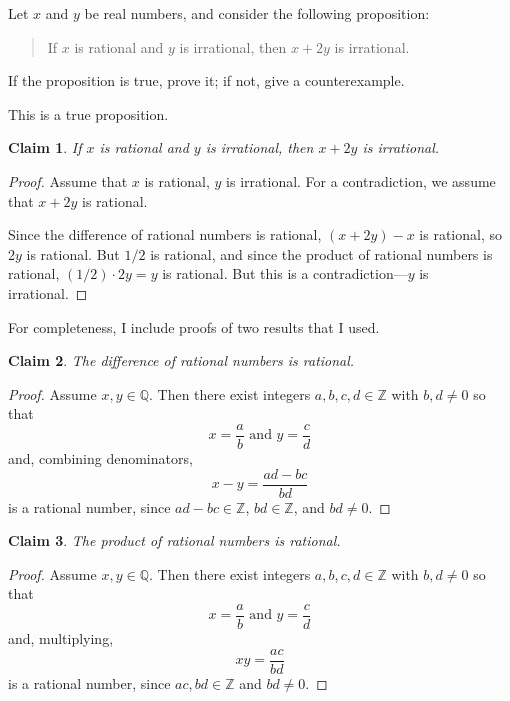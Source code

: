 \documentclass[12pt]{midterm}
\newtheorem*{claim}{Claim}
\begin{document}
\begin{exam}
\begin{solution}
\begin{solutiontext}
\end{solutiontext}\end{solution}


\begin{problem}[360]
  Let $x$ and $y$ be real numbers, and consider the following
  proposition:
  \begin{quote}
    If $x$ is rational and $y$ is irrational, then $x + 2y$ is irrational.
  \end{quote}
  If the proposition is true, prove it; if not, give a counterexample.

\end{problem}

\begin{solution}\begin{solutiontext}
This is a true proposition.

\begin{claim}
    If $x$ is rational and $y$ is irrational, then $x + 2y$ is irrational.
\end{claim}
\begin{proof}
  Assume that $x$ is rational, $y$ is irrational.  For a contradiction,
  we assume that $x+2y$ is rational.

  Since the difference of rational numbers is rational, $(x+2y) - x$ is
  rational, so $2y$ is rational.  But $1/2$ is rational, and since the
  product of rational numbers is rational, $(1/2) \cdot 2y = y$ is
  rational.  But this is a contradiction---$y$ is irrational.
\end{proof}

\vspace{1ex}\noindent%
For completeness, I include proofs of two results that I used.
\begin{claim}
The difference of rational numbers is rational.
\end{claim}
\begin{proof}
Assume $x, y \in \mathbb{Q}$.  Then there exist integers $a,b,c,d \in \mathbb{Z}$ with $b, d \neq 0$ so that
$$
x = \frac{a}{b} \mbox{ and } y = \frac{c}{d}
$$
and, combining denominators,
$$
x - y = \frac{ad - bc}{bd}
$$
is a rational number, since $ad - bc \in \mathbb{Z}$, $bd \in \mathbb{Z}$, and $bd \neq 0$.
\end{proof}

\begin{claim}
The product of rational numbers is rational.
\end{claim}
\begin{proof}
Assume $x, y \in \mathbb{Q}$.  Then there exist integers $a,b,c,d \in \mathbb{Z}$ with $b, d \neq 0$ so that
$$
x = \frac{a}{b} \mbox{ and } y = \frac{c}{d}
$$
and, multiplying,
$$
xy = \frac{ac}{bd}
$$
is a rational number, since $ac, bd \in \mathbb{Z}$ and $bd \neq 0$.
\end{proof}


\end{solutiontext}
\end{solution}
\end{exam}
\end{document}

